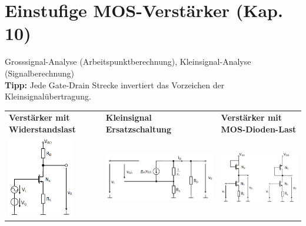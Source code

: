 \newpage
\section{Einstufige MOS-Verstärker (Kap. 10)}
Grosssignal-Analyse (Arbeitspunktberechnung), Kleinsignal-Analyse (Signalberechnung)\\
\textbf{Tipp:} Jede Gate-Drain Strecke invertiert das Vorzeichen der Kleinsignalübertragung.\\
\begin{tabular}{|p{}p{}|p{}|}
	\hline
	\textbf{Verstärker mit Widerstandslast}&\textbf{Kleinsignal Ersatzschaltung}&\textbf{Verstärker mit MOS-Dioden-Last}\\
	\includegraphics[height=3.5cm]{chapters/Verstaerker/images/AmpWiderstand}&
	\includegraphics[height=3.5cm]{chapters/Verstaerker/images/AmpWiderstandKS}&
	\includegraphics[height=3.5cm]{chapters/Verstaerker/images/AmpDiode}\\ 
\end{tabular}\\
